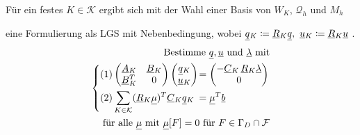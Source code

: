 Für ein festes $ K \in \mathcal{K} $ ergibt sich mit der Wahl einer Basis von $ W_K $, $ \mathcal{Q}_h $ und $ M_h $ 

eine Formulierung als LGS mit Nebenbedingung, wobei $ \ubar{q}_K \coloneqq \ubar{R}_K \ubar{q}, \ \ubar{u}_K \coloneqq \ubar{R}_K \ubar{u} $ .
\begin{align*}
\text{Bestimme } \underline{q}{}, \underline{u}{} \text{ und } \underline{\lambda}{} \text{ mit}\\
\begin{dcases}
(1) \begin{pmatrix}
\underline{A}{}_K & \underline{B}{}_K \\
\underline{B}{}_K^T & 0
\end{pmatrix}
\begin{pmatrix}
\underline{q}{}_K\\
\underline{u}{}_K
\end{pmatrix}
\mkern-16mu&= \begin{pmatrix}
- \underline{C}{}_K \, \underline{R}{}_K \underline{\lambda}{} \\
0
\end{pmatrix}\\
(2) \sum_{K \in \mathcal{K}}  (\underline{R}{}_K \underline{\mu}{})^T \underline{C}{}_K \underline{q}{}_K \mkern-16mu&= \underline{\mu}{}^T \underline{b}{}		
\end{dcases}\\
\text{für alle } \underline{\mu}{} \text{ mit } \underline{\mu}{}[F] = 0 \text{ für } F \in \Gamma_D \cap \mathcal{F}
\end{align*}

